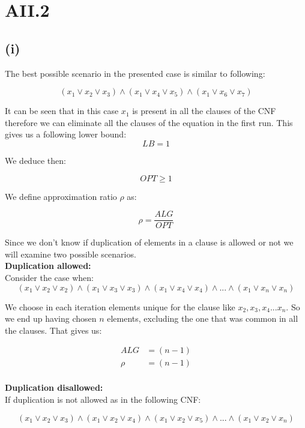 \section* {AII.2}
\label {a2-2}
\subsection*{(i)}

The best possible scenario in the presented case is similar to following:

$$ (x_1 \vee x_2  \vee x_3) \wedge (x_1 \vee x_4 \vee x_5) \wedge (x_1 \vee x_6 \vee x_7) $$

It can be seen that in this case $ x_1 $ is present in all the clauses of the CNF therefore we can eliminate all the clauses of the equation in the first run. This gives us a following lower bound:
$$ LB = 1 $$ 

We deduce then:

$$ OPT \ge 1 $$

We define approximation ratio $ \rho $ as:

$$ \rho = \frac{ALG}{OPT} $$

Since we don't know if duplication of elements in a clause is allowed or not we will examine two possible scenarios.\\

\textbf{Duplication allowed:}\\

Consider the case when:\\

$$ (x_1 \vee x_2  \vee x_2) \wedge (x_1 \vee x_3 \vee x_3) \wedge (x_1 \vee x_4 \vee x_4) \wedge ... \wedge (x_1 \vee x_n \vee x_n) $$

We choose in each iteration elements unique for the clause like $ x_2 , x_3 , x_4 ... x_n $. So we end up having chosen $ n $ elements, excluding the one that was common in all the clauses. That gives us:

\begin{align*}
	ALG &= (n-1)\\
	\rho &= (n-1) \\
\end{align*}

\textbf{Duplication disallowed:}\\

If duplication is not allowed as in the following CNF:

$$ (x_1 \vee x_2  \vee x_3) \wedge (x_1 \vee x_2 \vee x_4) \wedge (x_1 \vee x_2 \vee x_5) \wedge ... \wedge (x_1 \vee x_2 \vee x_n) $$

